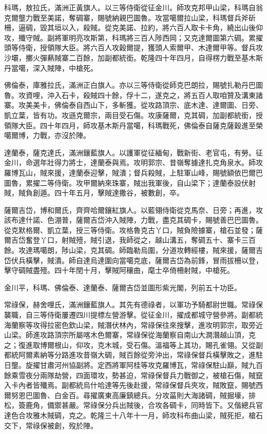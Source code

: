 \begin{pinyinscope}
科瑪，敖拉氏，滿洲正黃旗人。以三等侍衛從征金川。師攻克邦甲山梁，科瑪自翁克爾壟力戰至美諾，奪碉寨，賜號納親巴圖魯。攻當噶爾拉山梁，科瑪督兵斧斫柵，逼碉，毀其垣以入，殺賊。從克美諾、拉約，將六百人取卡卡角，繞出山後仰攻，殲守賊。副將軍明亮攻斯第，科瑪將三百人陟西岡；又克達爾圖第六碉。累擢頭等侍衛，授領隊大臣。將六百人攻穀爾提，獲頭人索爾甲、木達爾甲等。督兵攻沙壩，擲火彈爇賊寨二百餘，加副都統銜。乾隆四十年四月，自得楞力戰至基木斯丹當噶，深入賊陣，中槍死。

佛倫泰，庫雅拉氏，滿洲正白旗人。亦以三等侍衛從師克巴朗拉，賜號扎勒丹巴圖魯。攻資哩，沖入石卡，殺賊四十餘，俘十二，遂克之，將五百人取咱贊及溝東諸寨。攻美美卡，佛倫泰自西山下，多斬獲。從攻路頂宗、底木達、達爾圖、日旁、凱立葉，皆有功。攻遜克爾宗，兩目受石傷。攻康薩爾，克其碉，加副都統銜，授領隊大臣。四十年四月，師攻基木斯丹當噶，科瑪戰死，佛倫泰自薩克薩穀進至榮噶爾博，力戰，亦沒於陣。

達蘭泰，薩克達氏，滿洲鑲藍旗人。以護軍從征緬甸，戰新街、老官屯，有勞。征金川，命選年壯得力將士，達蘭泰與焉。攻明郭宗、昔嶺奪據達扎克角泉水。師攻羅博瓦山，賊來援，達蘭泰迎擊，賊潰；督兵殺賊，上駐軍山峰，賜號額依巴爾巴圖魯，累擢二等侍衛。攻甲爾納來珠寨，賊出我軍後，自山梁下；達蘭泰設伏射賊，賊負創遁。四十年五月，擊賊達撒谷，被數創，卒。

薩爾吉岱，博和爾氏，齊齊哈爾鑲紅旗人。以藍翎侍衛從克馬奈、日旁；再進，攻該布達什諾、色淜普，薩爾吉岱沖入賊陣，力戰，盡克其碉卡，賜號善巴巴圖魯。從克默格爾、凱立葉，授三等侍衛。攻格魯克古丫口，賊負險據寨，槍石並發；薩爾吉岱奮登丫口，射賊殪，賊引退，我師從之，越山溝五，奪碉五十、寨卡三百餘。攻達瑪噶朗，陟山梁，克其碉。師臨勒烏圍，分道攻轉經樓，賊來援，薩爾吉岱伏兵橫擊，賊潰。師自達烏達圍向當噶克底，薩爾吉岱為前鋒，冒雨拔柵以登，擊守碉賊盡殪。四十年閏十月，擊賊阿穰曲，麾士卒倚柵射賊，中槍死。

金川平，科瑪、佛倫泰、達蘭泰、薩爾吉岱並圖形紫光閣，列前五十功臣。

常祿保，赫舍哩氏，滿洲鑲藍旗人。其先有德祿者，以軍功予騎都尉世職。常祿保襲職，自三等侍衛屢遷四川提標左營游擊。從征金川，擢成都城守營參將。副都統海蘭察等攻得拉密色欽山梁，賊潛伏林內，常祿保往來搜擊，進攻明郭宗，取旁近山梁。師進攻路頂宗所屬喀木色爾寨，常祿保從海蘭察自南山大澗潛越山頂，克之；復進取博爾根山，仰攻，克木城，受石傷。溫福等上其功，賜孔雀翎。又從副都統阿爾素納等分路進攻昔嶺大碉，賊百餘從旁沖出，常祿保督兵橫擊敗之，進駐日壟。旋擢甘肅河州協副將。定西將軍阿桂等攻克羅博瓦，常祿保駐山巔，賊九百餘乘雪夜分兩隊劫營，四面環攻，勢甚迫，常祿保督兵力戰御之，被槍石傷，賊竄入卡內者皆殲焉。副都統烏什哈達等先後赴援，常祿保督兵夾攻，賊敗竄，賜號西爾努恩巴圖魯、白金百。尋擢廣東高廉鎮總兵。分攻菑則大海諸碉，賊掘壕，排松，簽鹿角，備禦甚嚴。常祿保分兵出賊後，合攻各碉卡，同時皆下。又偕總兵官達色合攻雅木賊碉，克之。乾隆三十八年十一月，師攻科布曲山梁，賊死拒，槍石交下，常祿保被創，歿於陣。


\end{pinyinscope}
